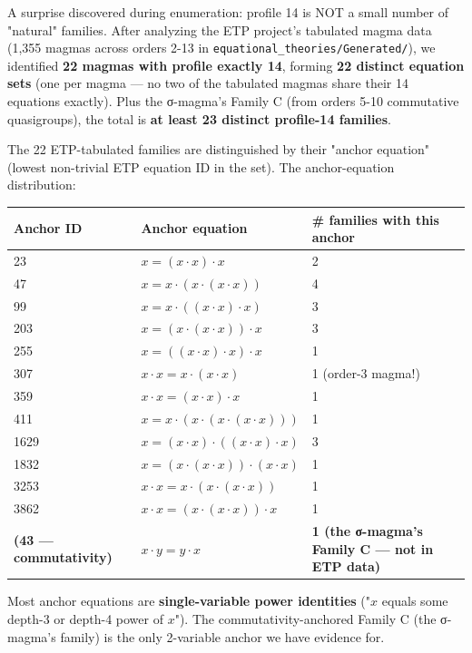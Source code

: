 \documentclass[11pt,reqno]{amsart}
\theoremstyle{plain}
\theoremstyle{definition}
\begin{document}
A surprise discovered during enumeration: profile 14 is NOT a small number of "natural" families. After analyzing the ETP project's tabulated magma data (1,355 magmas across orders 2-13 in \texttt{equational_theories/Generated/}), we identified \textbf{22 magmas with profile exactly 14}, forming \textbf{22 distinct equation sets} (one per magma --- no two of the tabulated magmas share their 14 equations exactly). Plus the σ-magma's Family C (from orders 5-10 commutative quasigroups), the total is \textbf{at least 23 distinct profile-14 families}.

The 22 ETP-tabulated families are distinguished by their "anchor equation" (lowest non-trivial ETP equation ID in the set). The anchor-equation distribution:

\begin{center}
\begin{tabular}{lll}
\toprule
Anchor ID & Anchor equation & # families with this anchor \\
\midrule
23 & $x = (x \cdot x) \cdot x$ & 2 \\
47 & $x = x \cdot (x \cdot (x \cdot x))$ & 4 \\
99 & $x = x \cdot ((x \cdot x) \cdot x)$ & 3 \\
203 & $x = (x \cdot (x \cdot x)) \cdot x$ & 3 \\
255 & $x = ((x \cdot x) \cdot x) \cdot x$ & 1 \\
307 & $x \cdot x = x \cdot (x \cdot x)$ & 1 (order-3 magma!) \\
359 & $x \cdot x = (x \cdot x) \cdot x$ & 1 \\
411 & $x = x \cdot (x \cdot (x \cdot (x \cdot x)))$ & 1 \\
1629 & $x = (x \cdot x) \cdot ((x \cdot x) \cdot x)$ & 3 \\
1832 & $x = (x \cdot (x \cdot x)) \cdot (x \cdot x)$ & 1 \\
3253 & $x \cdot x = x \cdot (x \cdot (x \cdot x))$ & 1 \\
3862 & $x \cdot x = (x \cdot (x \cdot x)) \cdot x$ & 1 \\
\textbf{(43 --- commutativity)} & $x \cdot y = y \cdot x$ & \textbf{1 (the σ-magma's Family C --- not in ETP data)} \\
\bottomrule
\end{tabular}
\end{center}

Most anchor equations are \textbf{single-variable power identities} ("$x$ equals some depth-3 or depth-4 power of $x$"). The commutativity-anchored Family C (the σ-magma's family) is the only 2-variable anchor we have evidence for.
\end{document}
